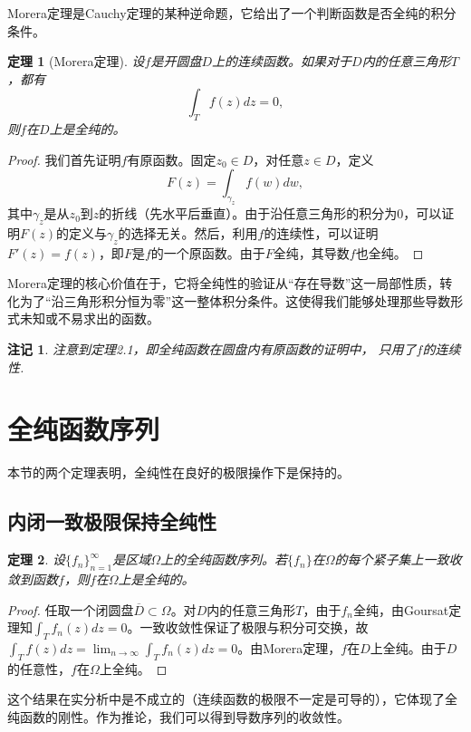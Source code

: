\documentclass[UTF8]{ctexart}
\newtheorem{theorem}{定理}[section]
\newtheorem{remark}{注记}[section]
\numberwithin{equation}{section}
\begin{document}
Morera定理是Cauchy定理的某种逆命题，它给出了一个判断函数是否全纯的积分条件。

\begin{theorem}[Morera定理]
    设$f$是开圆盘$D$上的连续函数。如果对于$D$内的任意三角形$T$，都有
    \[
    \int_T f(z) dz = 0,
    \]
    则$f$在$D$上是全纯的。
\end{theorem}

\begin{proof}
    我们首先证明$f$有原函数。固定$z_0\in D$，对任意$z\in D$，定义
    \[
    F(z) = \int_{\gamma_z} f(w) dw,
    \]
    其中$\gamma_z$是从$z_0$到$z$的折线（先水平后垂直）。由于沿任意三角形的积分为0，可以证明$F(z)$的定义与$\gamma_z$的选择无关。然后，利用$f$的连续性，可以证明$F'(z)=f(z)$，即$F$是$f$的一个原函数。由于$F$全纯，其导数$f$也全纯。
\end{proof}

Morera定理的核心价值在于，它将全纯性的验证从“存在导数”这一局部性质，转化为了“沿三角形积分恒为零”这一整体积分条件。这使得我们能够处理那些导数形式未知或不易求出的函数。
\begin{remark}
    注意到定理2.1，即全纯函数在圆盘内有原函数的证明中，
    只用了$f$的连续性.
\end{remark}


\section{全纯函数序列}

本节的两个定理表明，全纯性在良好的极限操作下是保持的。

\subsection{内闭一致极限保持全纯性}

\begin{theorem}
    设$\{f_n\}_{n=1}^\infty$是区域$\Omega$上的全纯函数序列。若$\{f_n\}$在$\Omega$的每个紧子集上一致收敛到函数$f$，则$f$在$\Omega$上是全纯的。
\end{theorem}

\begin{proof}
    任取一个闭圆盘$\overline{D}\subset\Omega$。对$D$内的任意三角形$T$，由于$f_n$全纯，由Goursat定理知$\int_T f_n(z)dz=0$。一致收敛性保证了极限与积分可交换，故$\int_T f(z)dz = \lim_{n\to\infty}\int_T f_n(z)dz = 0$。由Morera定理，$f$在$D$上全纯。由于$D$的任意性，$f$在$\Omega$上全纯。
\end{proof}

这个结果在实分析中是不成立的（连续函数的极限不一定是可导的），它体现了全纯函数的刚性。作为推论，我们可以得到导数序列的收敛性。
\end{document}
